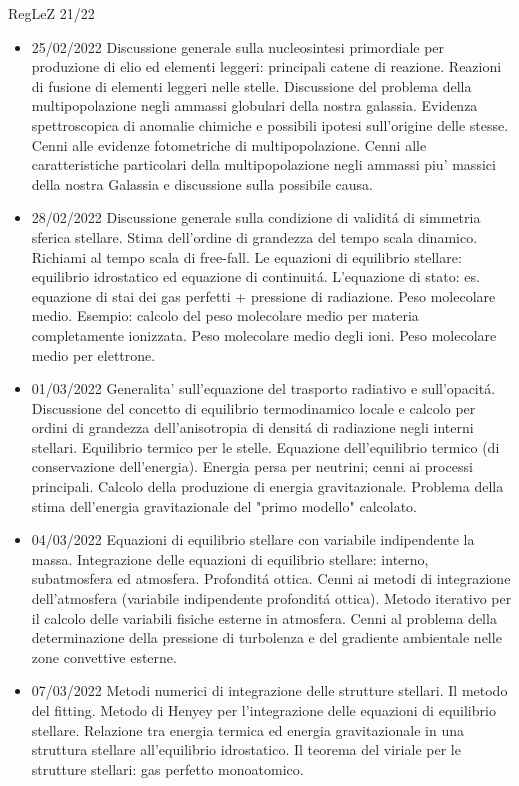 \begin{frame}[allowframebreaks]{RegLeZ 21/22}
\begin{itemize}
\item 25/02/2022 Discussione generale sulla nucleosintesi primordiale per produzione di elio ed elementi leggeri: principali catene di reazione. Reazioni di fusione di elementi leggeri nelle stelle. Discussione del problema della multipopolazione negli ammassi globulari della nostra galassia. Evidenza spettroscopica di anomalie chimiche e possibili ipotesi sull'origine delle stesse. Cenni alle evidenze fotometriche di multipopolazione. Cenni alle caratteristiche particolari della multipopolazione negli ammassi piu' massici della nostra Galassia e discussione sulla possibile causa.
\item 28/02/2022 Discussione generale sulla condizione di validit\'a di simmetria sferica stellare. Stima dell'ordine di grandezza del tempo scala dinamico. Richiami al tempo scala di free-fall. Le equazioni di equilibrio stellare: equilibrio idrostatico ed equazione di continuit\'a. L'equazione di stato: es. equazione di stai dei gas perfetti + pressione di radiazione. Peso molecolare medio. Esempio: calcolo del peso molecolare medio per materia completamente ionizzata. Peso molecolare medio degli ioni. Peso molecolare medio per elettrone.
\item 01/03/2022 Generalita' sull'equazione del trasporto radiativo e sull'opacit\'a. Discussione del concetto di equilibrio termodinamico locale e calcolo per ordini di grandezza dell'anisotropia di densit\'a di radiazione negli interni stellari. Equilibrio termico per le stelle. Equazione dell'equilibrio termico (di conservazione dell'energia). Energia persa per neutrini; cenni ai processi principali. Calcolo della produzione di energia gravitazionale. Problema della stima dell'energia gravitazionale del "primo modello" calcolato.
\item 04/03/2022 Equazioni di equilibrio stellare con variabile indipendente la massa. Integrazione delle equazioni di equilibrio stellare: interno, subatmosfera ed atmosfera. Profondit\'a ottica. Cenni ai metodi di integrazione dell'atmosfera (variabile indipendente profondit\'a ottica). Metodo iterativo per il calcolo delle variabili fisiche esterne in atmosfera. Cenni al problema della determinazione della pressione di turbolenza e del gradiente ambientale nelle zone convettive esterne.
\item 07/03/2022 Metodi numerici di integrazione delle strutture stellari. Il metodo del fitting. Metodo di Henyey per l'integrazione delle equazioni di equilibrio stellare. Relazione tra energia termica ed energia gravitazionale in una struttura stellare all'equilibrio idrostatico. Il teorema del viriale per le strutture stellari: gas perfetto monoatomico.

\end{itemize}
\end{frame}
